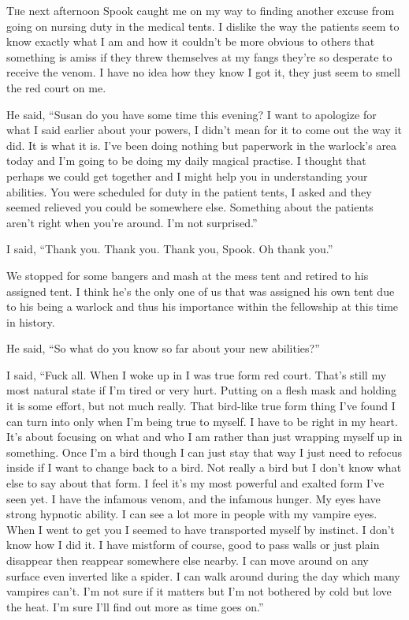 \lettrine[lines=2,lraise=0]{T}he next afternoon Spook caught me on my way to finding another excuse from going on nursing duty in the medical tents. I dislike the way the patients seem to know exactly what I am and how it couldn't be more obvious to others that something is amiss if they threw themselves at my fangs they're so desperate to receive the venom. I have no idea how they know I got it, they just seem to smell the red court on me.

He said, ``Susan do you have some time this evening? I want to apologize for what I said earlier about your powers, I didn't mean for it to come out the way it did. It is what it is. I've been doing nothing but paperwork in the warlock's area today and I'm going to be doing my daily magical practise. I thought that perhaps we could get together and I might help you in understanding your abilities. You were scheduled for duty in the patient tents, I asked and they seemed relieved you could be somewhere else. Something about the patients aren't right when you're around. I'm not surprised.''

I said, ``Thank you. Thank you. Thank you, Spook. Oh thank you.''

We stopped for some bangers and mash at the mess tent and retired to his assigned tent. I think he's the only one of us that was assigned his own tent due to his being a warlock and thus his importance within the fellowship at this time in history.

He said, ``So what do you know so far about your new abilities?''

I said, ``Fuck all. When I woke up in \chichenitza* I was true form red court. That's still my most natural state if I'm tired or very hurt. Putting on a flesh mask and holding it is some effort, but not much really. That bird-like true form thing I've found I can turn into only when I'm being true to myself. I have to be right in my heart. It's about focusing on what and who I am rather than just wrapping myself up in something. Once I'm a bird though I can just stay that way I just need to refocus inside if I want to change back to a bird. Not really a bird but I don't know what else to say about that form. I feel it's my most powerful and exalted form I've seen yet. I have the infamous venom, and the infamous hunger. My eyes have strong hypnotic ability. I can see a lot more in people with my vampire eyes. When I went to get you I seemed to have transported myself by instinct. I don't know how I did it. I have mistform of course, good to pass walls or just plain disappear then reappear somewhere else nearby. I can move around on any surface even inverted like a spider. I can walk around during the day which many vampires can't. I'm not sure if it matters but I'm not bothered by cold but love the heat. I'm sure I'll find out more as time goes on.''

